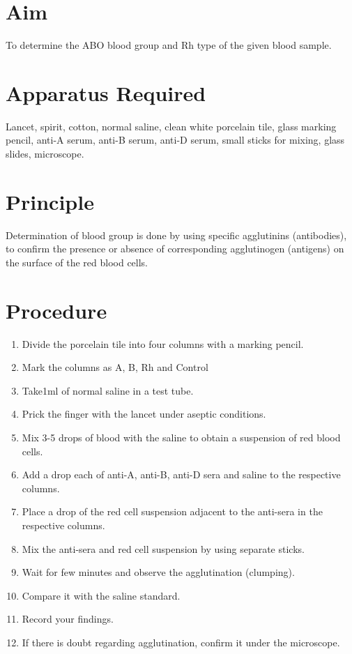 \documentclass[a4paper,12pt,openany,twoside]{book}
\begin{document}
								\section*{Aim}

									To determine the ABO blood group and Rh type of the given blood sample.
									\section*{Apparatus Required}
									Lancet, spirit, cotton, normal saline, clean white porcelain tile, glass marking pencil, anti-A serum, anti-B serum, anti-D serum, small sticks for mixing, glass slides, microscope.
									\section*{Principle}
									Determination of blood group is done by using specific agglutinins (antibodies), to confirm the presence or absence of corresponding agglutinogen (antigens) on the surface of the red blood cells.
									\section*{Procedure}
									\begin{enumerate}
										\item{Divide the porcelain tile into four columns with a marking pencil.}
										\item{Mark the columns as A, B, Rh and Control}
										\item{Take1ml of normal saline in a test tube.}
										\item{Prick the finger with the lancet under aseptic conditions.}
										\item{Mix 3-5 drops of blood with the saline to obtain a suspension of red blood cells.}
										\item{Add a drop each of anti-A, anti-B, anti-D sera and saline to the respective columns.}
										\item{Place a drop of the red cell suspension adjacent to the anti-sera in the respective columns.}
										\item{Mix the anti-sera and red cell suspension by using separate sticks.}
										\item{Wait for few minutes and observe the agglutination (clumping).}
										\item{Compare it with the saline standard.}
										\item{Record your findings.}
										\item{If there is doubt regarding agglutination, confirm it under the microscope.}
									\end{enumerate}
\end{document}
